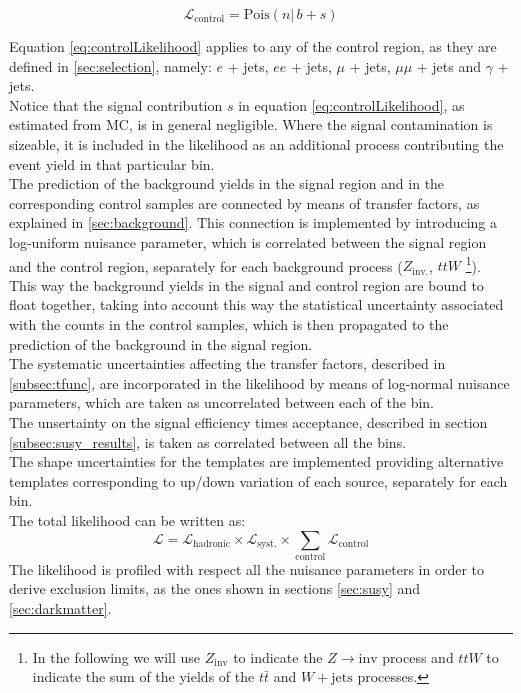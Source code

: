 \begin{equation}
\mathcal{L}_{\mathrm{control}}=\mathrm{Pois}(n |\, b + s)
\label{eq:controlLikelihood}
\end{equation}

Equation \ref{eq:controlLikelihood} applies to any of the control region, 
as they are defined in \ref{sec:selection}, namely: $e$ + jets, $ee$ + jets, $\mu$ + jets, $\mu\mu$ + jets and $\gamma$ + jets. \\
Notice that the signal contribution $s$ in equation \ref{eq:controlLikelihood}, as estimated from MC, is in general negligible. 
Where the signal contamination is sizeable, it is included in the likelihood as an additional process contributing the event yield in that particular bin. \\

The prediction of the background yields in the signal region and in the corresponding control samples are connected 
by means of transfer factors, as explained in \ref{sec:background}. 
This connection is implemented by introducing a log-uniform nuisance parameter, which is correlated 
between the signal region and the control region, separately for each background process ($Z_{\mathrm{inv.}}$, $ttW$ \footnote{In the following we will use $Z_{\mathrm{inv}}$ to indicate the $Z\to \mathrm{inv}$ process and $ttW$ to indicate the sum of the yields of the $t\bar{t}$ and $W+\mathrm{jets}$ processes.}). \\
This way the background yields in the signal and control region are bound to float together, 
taking into account this way the statistical uncertainty associated with the counts in the control samples, which is then propagated to the 
prediction of the background in the signal region. \\

The systematic uncertainties affecting the transfer factors, described in \ref{subsec:tfunc}, are incorporated in the likelihood by means of log-normal nuisance parameters, which are taken as uncorrelated between each of the \htcat bin. \\
The unsertainty on the signal efficiency times acceptance, described in section \ref{subsec:susy_results}, is taken as correlated between all the \htcat bins. \\
The shape uncertainties for the \mht templates are implemented providing alternative templates corresponding to up/down variation of each source, separately for each \htcat bin. \\

The total likelihood can be written as:
\begin{equation}
\label{eq:total_likelihood}
\mathcal{L} = \mathcal{L}_{\text{hadronic}} \times \mathcal{L}_{\text{syst.}} \times \sum _{\text{control}} \mathcal{L}_{\text{control}}
\end{equation}
The likelihood is profiled with respect all the nuisance parameters in order to derive exclusion limits, 
as the ones shown in sections \ref{sec:susy} and \ref{sec:darkmatter}. 




